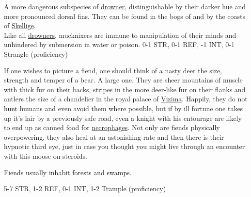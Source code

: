 {
    A more dangerous subspecies of \hyperref[monster:drowner]{drowner}, distinguishable by their darker hue and 
    more pronounced dorsal fins. They can be found in the bogs of  and by the coasts of
    \hyperref[region:skellige]{Skellige}.
    \\[1.5ex]
    Like all \hyperref[monster:drowner]{drowners}, mucknixers are immune to manipulation of their minds and
    unhindered by submersion in water or poison.
}{
    0-1 STR, 0-1 REF, -1 INT, 0-1 Strangle (proficiency)
}

{
    If one wishes to picture a fiend, one should think of a nasty deer the size, strength and temper of a bear. A 
    large one. They are sheer mountains of muscle with thick fur on their backs, stripes in the more deer-like fur 
    on their flanks and antlers the size of a chandelier in the royal palace of \hyperref[city:vizima]{Vizima}.
    Happily, they do not hunt humans and even avoid them where possible, but if by ill fortune one takes up it's 
    lair by a previously safe road, even a knight with his entourage are likely to end up as canned food for 
    \hyperref[monster:necrophage]{necrophages}. Not only are fiends physically overpowering, they also heal at an
    astonishing rate \textendash and then there is their hypnotic third eye, just in case you thought you might 
    live through an encounter with this moose on steroids.

    Fiends usually inhabit forests and swamps.
}{
    5-7 STR, 1-2 REF, 0-1 INT, 1-2 Trample (proficiency)
}

